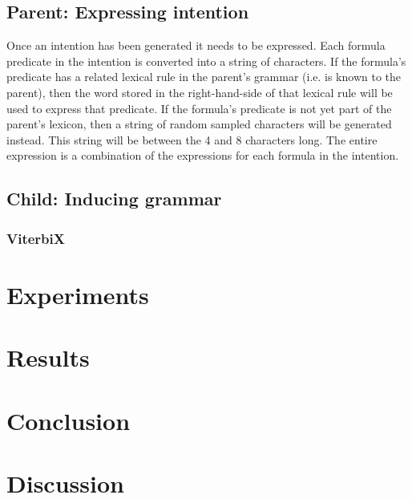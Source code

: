 \documentclass[a4paper]{article}
\begin{document}
\subsection{Parent: Expressing intention}
Once an intention has been generated it needs to be expressed. Each formula predicate in the intention is converted into a string of characters. If the formula's predicate has a related lexical rule in the parent's grammar (i.e. is known to the parent), then the word stored in the right-hand-side of that lexical rule will be used to express that predicate. If the formula's predicate is not yet part of the parent's lexicon, then a string of random sampled characters will be generated instead. This string will be between the 4 and 8 characters long. The entire expression is a combination of the expressions for each formula in the intention.
\subsection{Child: Inducing grammar} %
\subsubsection{ViterbiX} %
\section{Experiments}
\label{sec:experiments}
\section{Results}
\label{sec:results}
\section{Conclusion}
\label{sec:conclusion}
\section{Discussion}
\label{sec:discussion}



\end{document}
